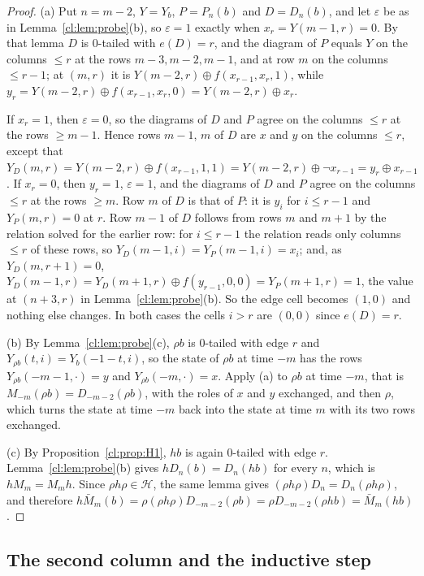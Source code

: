 \begin{proof}
(a) Put $n=m-2$, $Y=Y_b$, $P=P_n(b)$ and $D=D_n(b)$, and let $\varepsilon$ be as in Lemma~\ref{cl:lem:probe}(b), so $\varepsilon=1$ exactly when $x_r=Y(m-1,r)=0$. By that lemma $D$ is $0$-tailed with $e(D)=r$, and the diagram of $P$ equals $Y$ on the columns $\le r$ at the rows $m-3,m-2,m-1$, and at row $m$ on the columns $\le r-1$; at $(m,r)$ it is $Y(m-2,r)\oplus f(x_{r-1},x_r,1)$, while $y_r=Y(m-2,r)\oplus f(x_{r-1},x_r,0)=Y(m-2,r)\oplus x_r$.

If $x_r=1$, then $\varepsilon=0$, so the diagrams of $D$ and $P$ agree on the columns $\le r$ at the rows $\ge m-1$. Hence rows $m-1$, $m$ of $D$ are $x$ and $y$ on the columns $\le r$, except that $Y_D(m,r)=Y(m-2,r)\oplus f(x_{r-1},1,1)=Y(m-2,r)\oplus\neg x_{r-1}=y_r\oplus x_{r-1}$. If $x_r=0$, then $y_r=1$, $\varepsilon=1$, and the diagrams of $D$ and $P$ agree on the columns $\le r$ at the rows $\ge m$. Row $m$ of $D$ is that of $P$: it is $y_i$ for $i\le r-1$ and $Y_P(m,r)=0$ at $r$. Row $m-1$ of $D$ follows from rows $m$ and $m+1$ by the relation solved for the earlier row: for $i\le r-1$ the relation reads only columns $\le r$ of these rows, so $Y_D(m-1,i)=Y_P(m-1,i)=x_i$; and, as $Y_D(m,r+1)=0$, $Y_D(m-1,r)=Y_D(m+1,r)\oplus f(y_{r-1},0,0)=Y_P(m+1,r)=1$, the value at $(n+3,r)$ in Lemma~\ref{cl:lem:probe}(b). So the edge cell becomes $(1,0)$ and nothing else changes. In both cases the cells $i>r$ are $(0,0)$ since $e(D)=r$.

(b) By Lemma~\ref{cl:lem:probe}(c), $\rho b$ is $0$-tailed with edge $r$ and $Y_{\rho b}(t,i)=Y_b(-1-t,i)$, so the state of $\rho b$ at time $-m$ has the rows $Y_{\rho b}(-m-1,\cdot)=y$ and $Y_{\rho b}(-m,\cdot)=x$. Apply (a) to $\rho b$ at time $-m$, that is $M_{-m}(\rho b)=D_{-m-2}(\rho b)$, with the roles of $x$ and $y$ exchanged, and then $\rho$, which turns the state at time $-m$ back into the state at time $m$ with its two rows exchanged.

(c) By Proposition~\ref{cl:prop:H1}, $hb$ is again $0$-tailed with edge $r$. Lemma~\ref{cl:lem:probe}(b) gives $hD_n(b)=D_n(hb)$ for every $n$, which is $hM_m=M_mh$. Since $\rho h\rho\in\mathcal H$, the same lemma gives $(\rho h\rho)D_n=D_n(\rho h\rho)$, and therefore $h\bar M_m(b)=\rho(\rho h\rho)D_{-m-2}(\rho b)=\rho D_{-m-2}(\rho hb)=\bar M_m(hb)$.
\end{proof}

\subsection{The second column and the inductive step}\label{cl:sec:step}

